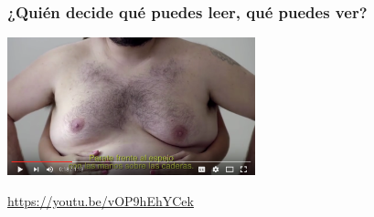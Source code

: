 \documentclass[17pt,aspectratio=169,hyperref=pdfusetitle]{beamer}
\begin{document}

\begin{frame}
\frametitle{¿Quién decide qué puedes leer, qué puedes ver?}

\begin{center}
\includegraphics[height=4cm]{figs/tetasxtetas}
\end{center}

{\small \url{https://youtu.be/vOP9hEhYCek}}
\end{frame}






\end{document}
